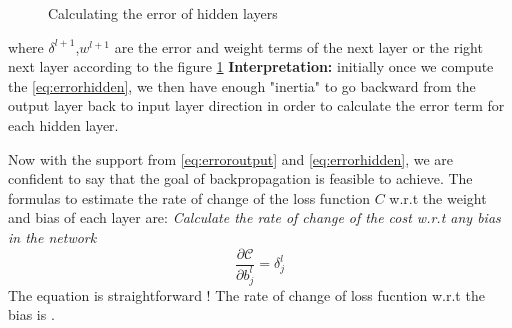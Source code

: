 \begin{figure}[H]
\centering
\caption{Calculating the error of hidden layers}
\label{fig:errorlayer}
\end{figure}
where $\delta^{l+1}$,$w^{l+1}$ are the error and weight terms of the next layer or the right next layer according to the figure \ref{fig:errorlayer}\newline \noindent
\textbf{Interpretation:} initially once we compute the \eqref{eq:errorhidden}, we then have enough "inertia" to go backward from the output layer back to input layer direction in order to calculate the error term for each hidden layer.

\vspace{1.5cm} \noindent
Now with the support from \eqref{eq:erroroutput} and \eqref{eq:errorhidden}, we are confident to say that the goal of backpropagation is feasible to achieve. The formulas to estimate the rate of change of the loss function $C$ w.r.t the weight and bias of each layer are:\newline \noindent
\newline \noindent
\textit{Calculate the rate of change of the cost w.r.t any bias in the network}
\begin{equation}\label{eq:errorbias}
    \frac{\partial \mathcal{C}}{\partial b^{l}_{j}} = \delta^{l}_{j}
\end{equation}
The equation is straightforward ! The rate of change of loss fucntion w.r.t the bias is \underline{}.


